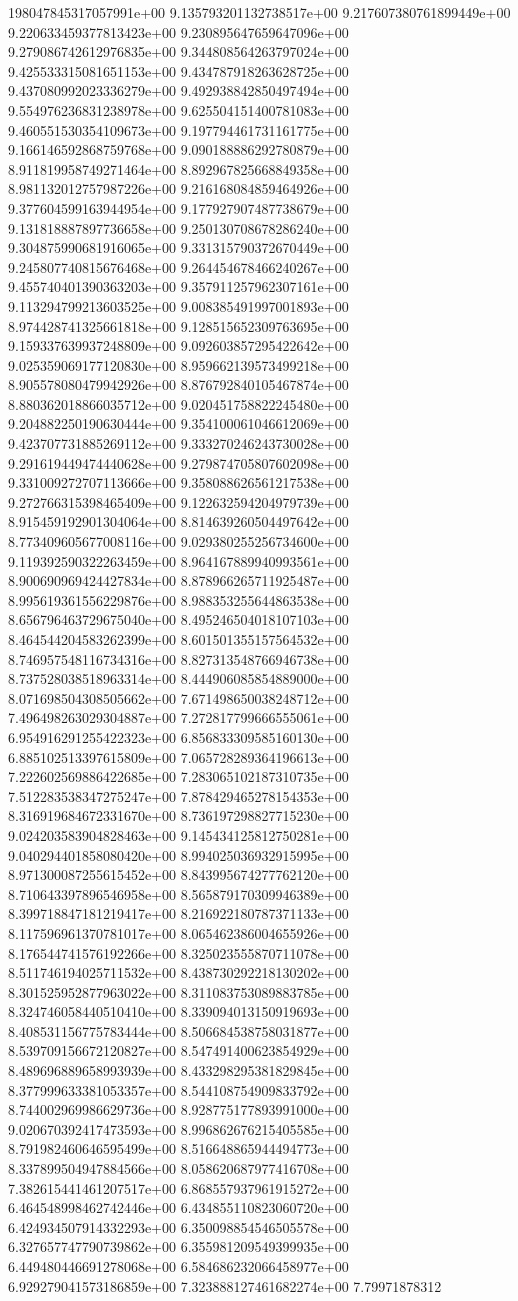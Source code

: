 198047845317057991e+00	9.135793201132738517e+00	9.217607380761899449e+00	9.220633459377813423e+00	9.230895647659647096e+00	9.279086742612976835e+00	9.344808564263797024e+00	9.425533315081651153e+00	9.434787918263628725e+00	9.437080992023336279e+00	9.492938842850497494e+00	9.554976236831238978e+00	9.625504151400781083e+00	9.460551530354109673e+00	9.197794461731161775e+00	9.166146592868759768e+00	9.090188886292780879e+00	8.911819958749271464e+00	8.892967825668849358e+00	8.981132012757987226e+00	9.216168084859464926e+00	9.377604599163944954e+00	9.177927907487738679e+00	9.131818887897736658e+00	9.250130708678286240e+00	9.304875990681916065e+00	9.331315790372670449e+00	9.245807740815676468e+00	9.264454678466240267e+00	9.455740401390363203e+00	9.357911257962307161e+00	9.113294799213603525e+00	9.008385491997001893e+00	8.974428741325661818e+00	9.128515652309763695e+00	9.159337639937248809e+00	9.092603857295422642e+00	9.025359069177120830e+00	8.959662139573499218e+00	8.905578080479942926e+00	8.876792840105467874e+00	8.880362018866035712e+00	9.020451758822245480e+00	9.204882250190630444e+00	9.354100061046612069e+00	9.423707731885269112e+00	9.333270246243730028e+00	9.291619449474440628e+00	9.279874705807602098e+00	9.331009272707113666e+00	9.358088626561217538e+00	9.272766315398465409e+00	9.122632594204979739e+00	8.915459192901304064e+00	8.814639260504497642e+00	8.773409605677008116e+00	9.029380255256734600e+00	9.119392590322263459e+00	8.964167889940993561e+00	8.900690969424427834e+00	8.878966265711925487e+00	8.995619361556229876e+00	8.988353255644863538e+00	8.656796463729675040e+00	8.495246504018107103e+00	8.464544204583262399e+00	8.601501355157564532e+00	8.746957548116734316e+00	8.827313548766946738e+00	8.737528038518963314e+00	8.444906085854889000e+00	8.071698504308505662e+00	7.671498650038248712e+00	7.496498263029304887e+00	7.272817799666555061e+00	6.954916291255422323e+00	6.856833309585160130e+00	6.885102513397615809e+00	7.065728289364196613e+00	7.222602569886422685e+00	7.283065102187310735e+00	7.512283538347275247e+00	7.878429465278154353e+00	8.316919684672331670e+00	8.736197298827715230e+00	9.024203583904828463e+00	9.145434125812750281e+00	9.040294401858080420e+00	8.994025036932915995e+00	8.971300087255615452e+00	8.843995674277762120e+00	8.710643397896546958e+00	8.565879170309946389e+00	8.399718847181219417e+00	8.216922180787371133e+00	8.117596961370781017e+00	8.065462386004655926e+00	8.176544741576192266e+00	8.325023555870711078e+00	8.511746194025711532e+00	8.438730292218130202e+00	8.301525952877963022e+00	8.311083753089883785e+00	8.324746058440510410e+00	8.339094013150919693e+00	8.408531156775783444e+00	8.506684538758031877e+00	8.539709156672120827e+00	8.547491400623854929e+00	8.489696889658993939e+00	8.433298295381829845e+00	8.377999633381053357e+00	8.544108754909833792e+00	8.744002969986629736e+00	8.928775177893991000e+00	9.020670392417473593e+00	8.996862676215405585e+00	8.791982460646595499e+00	8.516648865944494773e+00	8.337899504947884566e+00	8.058620687977416708e+00	7.382615441461207517e+00	6.868557937961915272e+00	6.464548998462742446e+00	6.434855110823060720e+00	6.424934507914332293e+00	6.350098854546505578e+00	6.327657747790739862e+00	6.355981209549399935e+00	6.449480446691278068e+00	6.584686232066458977e+00	6.929279041573186859e+00	7.323888127461682274e+00	7.79971878312